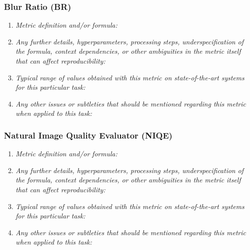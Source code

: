 \documentclass[a4paper,11pt]{article}
\begin{document}
        \subsubsection{Blur Ratio (BR)}
            \begin{enumerate}[label=\alph*.]
                \item \textit{Metric definition and/or formula:}
                \bigskip
                \item \textit{Any further details, hyperparameters, processing steps, underspecification of the formula, context dependencies, or other ambiguities in the metric itself that can affect reproducibility:}
                \bigskip
                \item \textit{Typical range of values obtained with this metric on state-of-the-art systems for this particular task:}
                \bigskip
                \item \textit{Any other issues or subtleties that should be mentioned regarding this metric when applied to this task:}
                \bigskip
            \end{enumerate}
        \subsubsection{Natural Image Quality Evaluator (NIQE)}
            \begin{enumerate}[label=\alph*.]
                \item \textit{Metric definition and/or formula:}
                \bigskip
                \item \textit{Any further details, hyperparameters, processing steps, underspecification of the formula, context dependencies, or other ambiguities in the metric itself that can affect reproducibility:}
                \bigskip
                \item \textit{Typical range of values obtained with this metric on state-of-the-art systems for this particular task:}
                \bigskip
                \item \textit{Any other issues or subtleties that should be mentioned regarding this metric when applied to this task:}
                \bigskip
            \end{enumerate}
\end{document}
